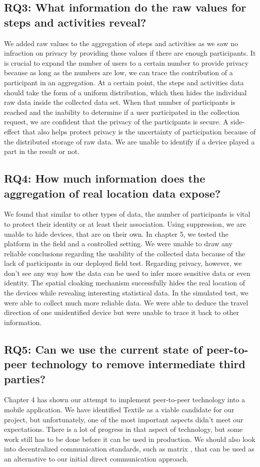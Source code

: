 \subsection*{RQ3: What information do the raw values for steps and activities reveal?}
We added raw values to the aggregation of steps and activities as we saw no infraction on privacy by providing these values if there are enough participants. It is crucial to expand the number of users to a certain number to provide privacy because as long as the numbers are low, we can trace the contribution of a participant in an aggregation. At a certain point, the steps and activities data should take the form of a uniform distribution, which then hides the individual raw data inside the collected data set. When that number of participants is reached and the inability to determine if a user participated in the collection request, we are confident that the privacy of the participants is secure. A side-effect that also helps protect privacy is the uncertainty of participation because of the distributed storage of raw data. We are unable to identify if a device played a part in the result or not.

\subsection*{RQ4: How much information does the aggregation of real location data expose?}
We found that similar to other types of data, the number of participants is vital to protect their identity or at least their association. Using suppression, we are unable to hide devices, that are on their own. In chapter 5, we tested the platform in the field and a controlled setting. We were unable to draw any reliable conclusions regarding the usability of the collected data because of the lack of participants in our deployed field test. Regarding privacy, however, we don't see any way how the data can be used to infer more sensitive data or even identity. The spatial cloaking mechanism successfully hides the real location of the devices while revealing interesting statistical data. In the simulated test, we were able to collect much more reliable data. We were able to deduce the travel direction of one unidentified device but were unable to trace it back to other information.

\subsection*{RQ5: Can we use the current state of peer-to-peer technology to remove intermediate third parties?}
Chapter 4 has shown our attempt to implement peer-to-peer technology into a mobile application. We have identified Textile as a viable candidate for our project, but unfortunately, one of the most important aspects didn't meet our expectations. There is a lot of progress in that aspect of technology, but some work still has to be done before it can be used in production. We should also look into decentralized communication standards, such as matrix \cite{matrix}, that can be used as an alternative to our initial direct communication approach.

